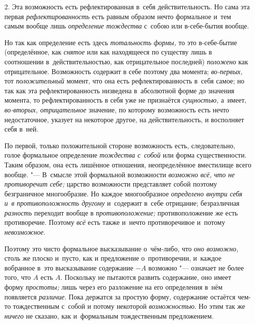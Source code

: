 2. Эта возможность есть рефлектированная в~себя действительность. Но сама
эта первая {\em рефлектированность} есть равным образом
нечто формальное и~тем самым вообще лишь
{\em определение тождества} с~собою или в-себе-бытия вообще.

Но так как определение есть здесь {\em тотальность
формы,} то это в-себе-бытие (определённое, как
{\em снятое} или как находящееся по существу лишь в
соотношении в~действительностью, как отрицательное последней)
{\em положено} как отрицательное. Возможность содержит
в себе поэтому два момента; {\em во-первых,} тот
{\em положительный} момент, что она есть
рефлектированность в~себя самое; но так как эта рефлектированность
низведена в~абсолютной форме до значения момента, то рефлектированность в
себя уже не признаётся {\em сущностью,} а~имеет,
{\em во-вторых, отрицательное} значение, по которому возможность
есть нечто недостаточное, указует на некоторое другое, на действительность,
и восполняет себя в~ней.

По первой, только положительной стороне возможность есть, следовательно,
голое формальное определение {\em тождества с~собой}
или форма существенности. Таким образом, она есть лишённое отношения,
неопределённое вместилище всего вообще. "--- В~смысле этой формальной
возможности {\em возможно всё, что не противоречит
себе;} царство возможности представляет собой поэтому безграничное
многообразие. Но каждое многообразное {\em определено
внутри себя и~в противоположность другому} и~содержит в~себе отрицание;
безразличная {\em разность} переходит вообще в
{\em противоположение;} противоположение же есть
противоречие. Поэтому {\em всё} есть также и~нечто
противоречивое и~потому {\em невозможное}.

Поэтому это чисто формальное высказывание о~чём-либо, что
{\em оно возможно,} столь же плоско и~пусто, как и
предложение о~противоречии, и~каждое вобранное в~это высказывание
содержание $-A$ возможно "--- означает не более того, что $A$
есть $A$. Поскольку не пытаются развить содержание, оно имеет форму
{\em простоты;} лишь через его разложение на его
определения в~нём появляется {\em различие}. Пока
держатся за простую форму, содержание остаётся чем-то тождественным с~собой
и потому некоторой {\em возможностью}. Но этим так же
{\em ничего} не сказано, как и~формальным тождественным
предложением.

